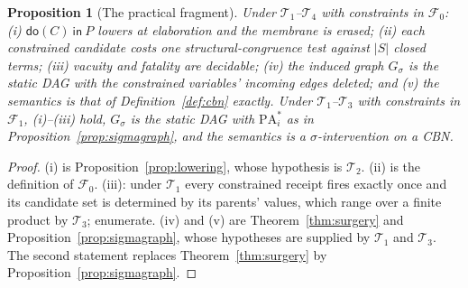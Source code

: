 \documentclass[11pt,a4paper]{article}
\theoremstyle{plain}
\newtheorem{proposition}[theorem]{Proposition}
\theoremstyle{definition}
\theoremstyle{remark}
\newcommand{\dok}{\textsf{do}}
\newcommand{\ink}{\textsf{in}}
\newcommand{\PA}{\mathrm{PA}}
\begin{document}
\begin{proposition}[The practical fragment]\label{prop:practical}
Under $\mathcal{T}_1$--$\mathcal{T}_4$ with constraints in $\mathcal{F}_0$:
(i) $\dok(C)\ \ink\ P$ lowers at elaboration and the membrane is erased;
(ii) each constrained candidate costs one structural-congruence test against
$|S|$ closed terms; (iii) vacuity and fatality are decidable; (iv) the induced
graph $G_\sigma$ is the static DAG with the constrained variables' incoming edges
deleted; and (v) the semantics is that of Definition~\ref{def:cbn} exactly.
Under $\mathcal{T}_1$--$\mathcal{T}_3$ with constraints in $\mathcal{F}_1$,
(i)--(iii) hold, $G_\sigma$ is the static DAG with $\PA^*_i$ as in
Proposition~\ref{prop:sigmagraph}, and the semantics is a $\sigma$-intervention
on a CBN.
\end{proposition}

\begin{proof}
(i) is Proposition~\ref{prop:lowering}, whose hypothesis is $\mathcal{T}_2$.
(ii) is the definition of $\mathcal{F}_0$. (iii): under $\mathcal{T}_1$ every
constrained receipt fires exactly once and its candidate set is determined by
its parents' values, which range over a finite product by $\mathcal{T}_3$;
enumerate. (iv) and (v) are Theorem~\ref{thm:surgery} and
Proposition~\ref{prop:sigmagraph}, whose hypotheses are supplied by
$\mathcal{T}_1$ and $\mathcal{T}_3$. The second statement replaces
Theorem~\ref{thm:surgery} by Proposition~\ref{prop:sigmagraph}.
\end{proof}
\end{document}
